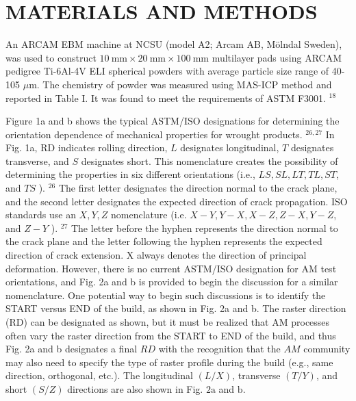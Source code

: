 \documentclass[10pt]{article}
\begin{document}
\section*{MATERIALS AND METHODS}
An ARCAM EBM machine at NCSU (model A2; Arcam AB, Mölndal Sweden), was used to construct $10 \mathrm{~mm} \times 20 \mathrm{~mm} \times 100 \mathrm{~mm}$ multilayer pads using ARCAM pedigree Ti-6Al-4V ELI spherical powders with average particle size range of 40-105 $\mu \mathrm{m}$. The chemistry of powder was measured using MAS-ICP method and reported in Table I. It was found to meet the requirements of ASTM F3001. ${ }^{18}$

Figure 1a and b shows the typical ASTM/ISO designations for determining the orientation dependence of mechanical properties for wrought products. ${ }^{26,27}$ In Fig. 1a, RD indicates rolling direction, $L$ designates longitudinal, $T$ designates transverse, and $S$ designates short. This nomenclature creates the possibility of determining the properties in six different orientations (i.e., $L S, S L, L T, T L, S T$, and $T S$ ). ${ }^{26}$ The first letter designates the direction normal to the crack plane, and the second letter designates the expected direction of crack propagation. ISO standards use an $X, Y, Z$ nomenclature (i.e. $X-Y, Y-X, X-Z, Z-X, Y-Z$, and $Z-Y$ ). ${ }^{27}$ The letter before the hyphen represents the direction normal to the crack plane and the letter following the hyphen represents the expected direction of crack extension. $\mathrm{X}$ always denotes the direction of principal deformation. However, there is no current ASTM/ISO designation for AM test orientations, and Fig. 2a and b is provided to begin the discussion for a similar nomenclature. One potential way to begin such discussions is to identify the START versus END of the build, as shown in Fig. 2a and b. The raster direction (RD) can be designated as shown, but it must be realized that AM processes often vary the raster direction from the START to END of the build, and thus Fig. 2a and b designates a final $R D$ with the recognition that the $A M$ community may also need to specify the type of raster profile during the build (e.g., same direction, orthogonal, etc.). The longitudinal $(L / X)$, transverse $(T / Y)$, and short $(S / Z)$ directions are also shown in Fig. $2 \mathrm{a}$ and $\mathrm{b}$.
\end{document}
